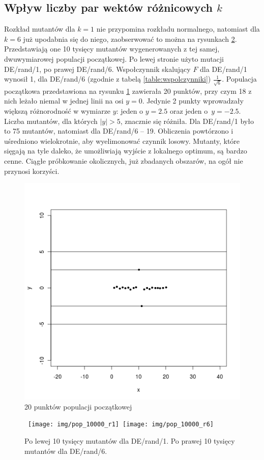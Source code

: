 \documentclass[a4paper,onecolumn,oneside,12pt,wide,floatssmall]{mwrep}
\theoremstyle{definition}
\theoremstyle{plain}%
\theoremstyle{remark}
\begin{document}
\subsection{Wpływ liczby par wektów różnicowych $k$}

Rozkład mutantów dla $k = 1$ nie przypomina rozkładu normalnego, 
natomiast dla $k = 6$ już upodabnia się do niego, zaobserwować to można na rysunkach \ref{fig:10k}. 
Przedstawiają one 10 tysięcy mutantów wygenerowanych z tej samej, dwuwymiarowej populacji początkowej.
Po lewej stronie użyto mutacji DE/rand/1, po prawej DE/rand/6. Wspołczynnik skalujący $F$ dla 
DE/rand/1 wynosił 1, dla DE/rand/6 (zgodnie z tabelą \ref{table:wspolczynniki}) $\frac{1}{\sqrt{6}}$.
Populacja początkowa przedstawiona na rysunku \ref{fig:10k_start} zawierała 20 punktów, 
przy czym 18 z nich leżało niemal w jednej linii na osi $y = 0$. 
Jedynie 2 punkty wprowadzały większą różnorodność 
w wymiarze $y$: jeden o $y = 2.5$ oraz jeden o~$y = -2.5$. Liczba mutantów,
dla których $|y| > 5$, znacznie się różniła. Dla DE/rand/1 było to 75 mutantów,
natomiast dla DE/rand/6 -- 19. Obliczenia
powtórzono i uśredniono wielokrotnie, aby wyelimonować czynnik losowy. Mutanty, które sięgają
na tyle daleko, że umożliwiają wyjście z lokalnego optimum, są bardzo cenne. 
Ciągłe próbkowanie okolicznych, już zbadanych obszarów, na ogół nie przynosi korzyści. 

\begin{figure}[H]
\centering
\includegraphics[width=.5\textwidth]{img/pop} 
\caption{20 punktów populacji początkowej} 
\label{fig:10k_start}
\end{figure}

\begin{figure}[H]
\centering
\mbox{
\texttt{[image: img/pop\_10000\_r1]}
\texttt{[image: img/pop\_10000\_r6]}  
}
\caption{Po lewej 10 tysięcy mutantów dla DE/rand/1. Po prawej 10 tysięcy mutantów dla DE/rand/6.} 
\label{fig:10k}
\end{figure}
\end{document}
